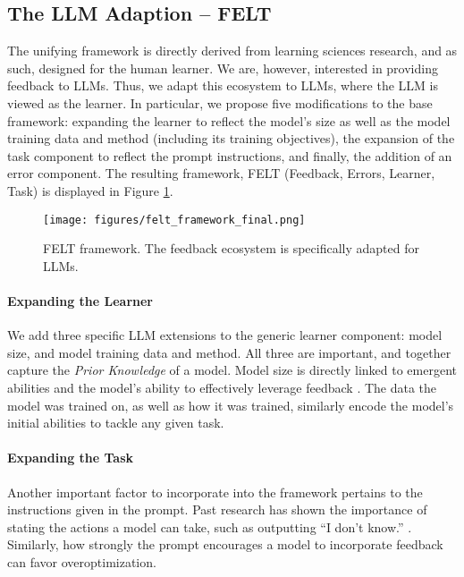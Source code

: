 \subsection{The LLM Adaption -- FELT}

The unifying framework is directly derived from learning sciences research, and as such, designed for the human learner. We are, however, interested in providing feedback to LLMs. Thus, we adapt this ecosystem to LLMs, where the LLM is viewed as the learner. In particular, we propose five modifications to the base framework: 
expanding the learner to reflect the model's size as well as the model training data and method (including its training objectives), the expansion of the task component to reflect the prompt instructions, and finally, the addition of an error component. The resulting framework, FELT (Feedback, Errors, Learner, Task) is displayed in 
Figure \ref{fig:felt_framework}. 

\begin{figure}[ht]
\centering
\texttt{[image: figures/felt\_framework\_final.png]}
\caption{FELT framework. The feedback ecosystem is specifically adapted for LLMs.}
\label{fig:felt_framework}
\end{figure}

\paragraph{Expanding the Learner} We add three specific LLM extensions to the generic learner component: model size, and model training data and method. All three are important, and together capture the \textit{Prior Knowledge} of a model. Model size is directly linked to emergent abilities \citep{wei2022emergent} and the model's ability to effectively leverage feedback \citep{scheurer2022training, bai_constitutional_2022}. The data the model was trained on, as well as how it was trained, similarly encode the model's initial abilities to tackle any given task.

\paragraph{Expanding the Task} Another important factor to incorporate into the framework pertains to the instructions given in the prompt. Past research has shown the importance of stating the actions a model can take, such as outputting ``I don't know.'' \citep{zhou2023contextfaithful}. Similarly, how strongly the prompt encourages a model to incorporate feedback can favor overoptimization.

